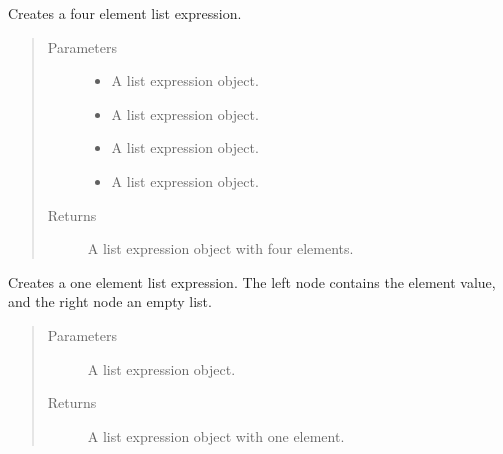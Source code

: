 \documentclass[letterpaper,10pt,english]{sphinxmanual}
\begin{document}
\begin{fulllineitems}
\label{\detokenize{index:secondodb.api.support.secondolistexpr.four_element_list}}
Creates a four element list expression.
\begin{quote}\begin{description}
\item[{Parameters}] \leavevmode\begin{itemize}
\item {} 
 \textendash{} A list expression object.

\item {} 
 \textendash{} A list expression object.

\item {} 
 \textendash{} A list expression object.

\item {} 
 \textendash{} A list expression object.

\end{itemize}

\item[{Returns}] \leavevmode
A list expression object with four elements.

\end{description}\end{quote}

\end{fulllineitems}


\begin{fulllineitems}
\label{\detokenize{index:secondodb.api.support.secondolistexpr.one_element_list}}
Creates a one element list expression. The left node contains the element value, and the right node an empty list.
\begin{quote}\begin{description}
\item[{Parameters}] \leavevmode
{} \textendash{} A list expression object.

\item[{Returns}] \leavevmode
A list expression object with one element.

\end{description}\end{quote}

\end{fulllineitems}
\end{document}
